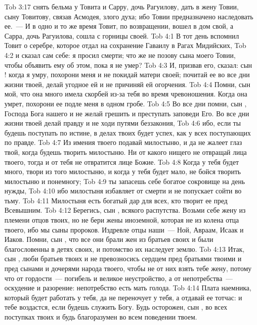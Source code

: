 \vs Tob 3:17 снять бельма у Товита и Сарру, дочь Рагуилову, дать в жену Товии, сыну Товитову, связав Асмодея, злого духа; ибо Товии предназначено наследовать ее.~--- И в одно и то же время Товит, по возвращении, вошел в дом свой, а Сарра, дочь Рагуилова, сошла с горницы своей.
\vs Tob 4:1 В тот день вспомнил Товит о серебре, которое отдал на сохранение Гаваилу в Рагах Мидийских,
\vs Tob 4:2 и сказал сам себе: я просил смерти; что же не позову сына моего Товии, чтобы объявить ему об этом, пока я не умер?
\vs Tob 4:3 И, призвав его, сказал: сын ! когда я умру, похорони меня и не покидай матери своей; почитай ее во все дни жизни твоей, делай угодное ей и не причиняй ей огорчения.
\vs Tob 4:4 Помни, сын мой, что она много имела скорбей из-за тебя  во время чревоношения. Когда она умрет, похорони ее подле меня в одном гробе.
\vs Tob 4:5 Во все дни помни, сын , Господа Бога нашего и не желай грешить и преступать заповеди Его. Во все дни жизни твоей делай правду и не ходи путями беззакония,
\vs Tob 4:6 ибо, если ты будешь поступать по истине, в делах твоих будет успех, как у всех поступающих по правде.
\vs Tob 4:7 Из имения твоего подавай милостыню, и да не жалеет глаз твой, когда будешь творить милостыню. Ни от какого нищего не отвращай лица твоего, тогда и от тебя не отвратится лице Божие.
\vs Tob 4:8 Когда у тебя будет много, твори из того милостыню, и когда у тебя будет мало, не бойся творить милостыню и понемногу;
\vs Tob 4:9 ты запасешь себе богатое сокровище на день нужды,
\vs Tob 4:10 ибо милостыня избавляет от смерти и не попускает сойти во тьму.
\vs Tob 4:11 Милостыня есть богатый дар для всех, кто творит ее пред Всевышним.
\vs Tob 4:12 Берегись, сын , всякого  распутства. Возьми себе жену из племени отцов твоих, но не бери жены иноземной, которая не из колена отца твоего, ибо мы сыны пророков. Издревле отцы наши~--- Ной, Авраам, Исаак и Иаков. Помни, сын , что все они брали жен из  братьев своих и были благословенны в детях своих, и потомство их наследует землю.
\vs Tob 4:13 Итак, сын , люби братьев твоих и не превозносись сердцем пред братьями твоими и пред сынами и дочерями народа твоего, чтобы не от них взять тебе жену, потому что от гордости~--- погибель и великое неустройство, а от непотребства~--- оскудение и разорение: непотребство есть мать голода.
\vs Tob 4:14 Плата наемника, который будет работать у тебя, да не переночует у тебя, а отдавай ее тотчас: и тебе воздастся, если будешь служить Богу. Будь осторожен, сын , во всех поступках твоих и будь благоразумен во всем поведении твоем.
